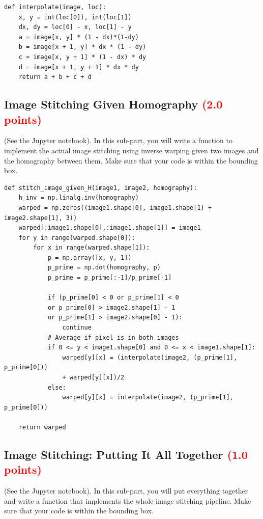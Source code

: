 \documentclass[answers]{exam}
\newcommand{\mypoints}[1]{\textcolor{red}{(#1 points)}}
\begin{document}
\begin{solution}
    \begin{verbatim}
def interpolate(image, loc):
    x, y = int(loc[0]), int(loc[1])
    dx, dy = loc[0] - x, loc[1] - y
    a = image[x, y] * (1 - dx)*(1-dy)
    b = image[x + 1, y] * dx * (1 - dy)
    c = image[x, y + 1] * (1 - dx) * dy
    d = image[x + 1, y + 1] * dx * dy
    return a + b + c + d
    \end{verbatim}
    \end{solution}

\subsection{Image Stitching Given Homography \mypoints{2.0}}
(See the Jupyter notebook). In this sub-part, you will  write a function to implement the actual image stitching using inverse warping given two images and the homography between them. Make sure that your code is within the bounding box.

\begin{solution}
    \begin{verbatim}
def stitch_image_given_H(image1, image2, homography):
    h_inv = np.linalg.inv(homography)
    warped = np.zeros((image1.shape[0], image1.shape[1] + image2.shape[1], 3))
    warped[:image1.shape[0],:image1.shape[1]] = image1
    for y in range(warped.shape[0]):
        for x in range(warped.shape[1]):
            p = np.array([x, y, 1])
            p_prime = np.dot(homography, p)
            p_prime = p_prime[:-1]/p_prime[-1]

            if (p_prime[0] < 0 or p_prime[1] < 0
            or p_prime[0] > image2.shape[1] - 1 
            or p_prime[1] > image2.shape[0] - 1):
                continue
            # Average if pixel is in both images
            if 0 <= y < image1.shape[0] and 0 <= x < image1.shape[1]:
                warped[y][x] = (interpolate(image2, (p_prime[1], p_prime[0])) 
                + warped[y][x])/2
            else:
                warped[y][x] = interpolate(image2, (p_prime[1], p_prime[0]))

    return warped
    \end{verbatim}
    \end{solution}

\subsection{Image Stitching: Putting It All Together \mypoints{1.0}}
(See the Jupyter notebook). In this sub-part, you will put everything together and write a function that implements the whole image stitching pipeline. Make sure that your code is within the bounding box.
\end{document}
